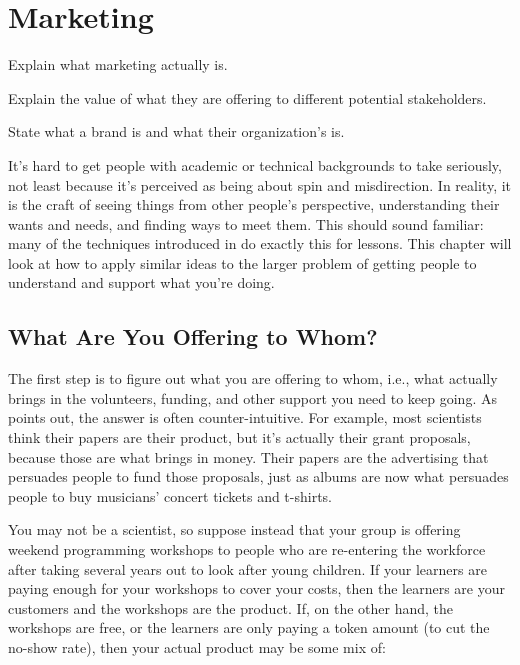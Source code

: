 \chapter{Marketing}\label{s:marketing}

\begin{objectives}

\item
  Explain what marketing actually is.

\item
  Explain the value of what they are offering to different potential
  stakeholders.

\item
  State what a brand is and what their organization's is.

\end{objectives}

It's hard to get people with academic or technical backgrounds to take
 seriously, not least because it's
perceived as being about spin and misdirection. In reality, it is the
craft of seeing things from other people's perspective, understanding
their wants and needs, and finding ways to meet them. This should
sound familiar: many of the techniques introduced in
 do exactly this for lessons. This chapter will
look at how to apply similar ideas to the larger problem of getting
people to understand and support what you're doing.

\section{What Are You Offering to Whom?}\label{s:marketing-what-whom}

The first step is to figure out what you are offering to whom, i.e.,
what actually brings in the volunteers, funding, and other support you
need to keep going.  As \cite{Kuch2011} points out, the answer is
often counter-intuitive. For example, most scientists think their
papers are their product, but it's actually their grant proposals,
because those are what brings in money. Their papers are the
advertising that persuades people to fund those proposals, just as
albums are now what persuades people to buy musicians' concert tickets
and t-shirts.

You may not be a scientist, so suppose instead that your group is
offering weekend programming workshops to people who are re-entering
the workforce after taking several years out to look after young
children.  If your learners are paying enough for your workshops to
cover your costs, then the learners are your customers and the
workshops are the product. If, on the other hand, the workshops are
free, or the learners are only paying a token amount (to cut the
no-show rate), then your actual product may be some mix of:

